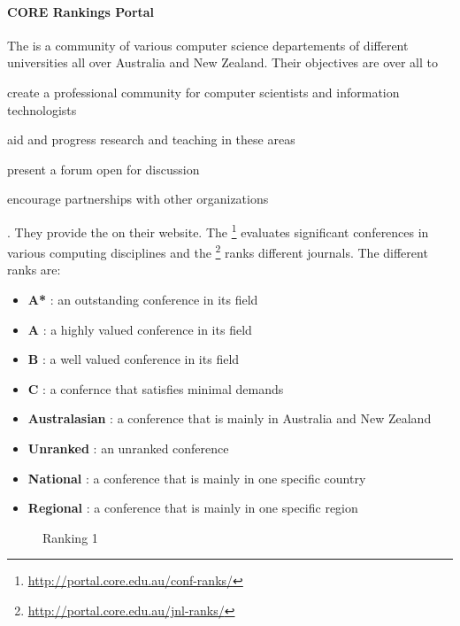 \clearpage
\paragraph{CORE Rankings Portal }The  is a community of various computer science departements of different universities all over Australia and New Zealand. Their objectives are over all to 
\begin{enumerate*}[label={\Alph*)},font={\color{red!50!black}\bfseries}]
	\item create a professional community for computer scientists and information technologists
	\item aid and progress research and teaching in these areas
	\item present a forum open for discussion 
	\item encourage partnerships with other organizations
\end{enumerate*}. 
They provide the  on their website. 
The \footnote{\url{http://portal.core.edu.au/conf-ranks/}} evaluates significant conferences in various computing disciplines and the \footnote{\url{http://portal.core.edu.au/jnl-ranks/}} ranks different journals. The different ranks are:
\begin{itemize}[noitemsep]
	\item \textbf{A*} : an outstanding conference in its field
	\item \textbf{A} : a highly valued conference in its field
	\item \textbf{B} : a well valued conference in its field
	\item \textbf{C} : a confernce that satisfies minimal demands
	\item \textbf{Australasian} : a conference that is mainly in Australia and New Zealand
	\item \textbf{Unranked} : an unranked conference
	\item \textbf{National} : a conference that is mainly in one specific country
	\item \textbf{Regional} : a conference that is mainly in one specific region
\end{itemize}
\begin{figure}[!ht]
	\centering
	\caption{Ranking 1} \label{graph:rq3_publication_channel_1}
\end{figure}

